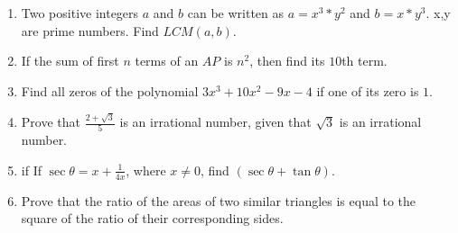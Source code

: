 \documentclass[12pt,-letter paper]{article}
\begin{document}
\begin{enumerate}
\item Two positive integers $a$ and $b$ can be written as $a = x^3*y^2$ and $b = x*y^3$. x,y are prime numbers. Find $LCM (a, b)$. 
\item If the sum of first $n$ terms of an $AP$ is $n^2$, then find its $10$th term.
\item Find all zeros of the polynomial $3x ^ 3 + 10x ^ 2 - 9x - 4$ if one of its zero is $1$.
\item Prove that $\frac{2+\sqrt{3}}{5}$  is an irrational number, given that $\sqrt{3}$ is an irrational number. 
\item if If $\sec\theta = x + \frac{1}{4x}$, where $x \neq 0$, find $(\sec\theta + \tan\theta)$.
\item Prove that the ratio of the areas of two similar triangles is equal to the square of the ratio of their corresponding sides.
\end{enumerate} 
\end{document}
